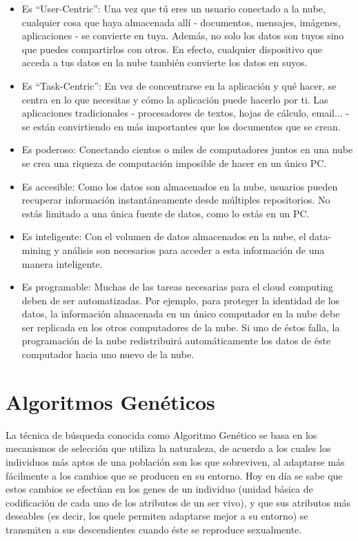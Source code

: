 \documentclass[runningheads]{llncs}
\begin{document}
\begin{itemize}

\item Es ``User-Centric'': Una vez que tú eres un usuario conectado a la nube, cualquier cosa que haya almacenada allí - documentos, mensajes, 
imágenes, aplicaciones - se convierte en tuya. Además, no solo los datos son tuyos sino que puedes compartirlos con otros. 
En efecto, cualquier dispositivo que acceda a tus datos en la nube también convierte los datos en suyos.
\item Es ``Task-Centric'': En vez de concentrarse en la aplicación y qué hacer, se centra en lo que necesitas y cómo la aplicación puede 
hacerlo por ti. Las aplicaciones tradicionales - procesadores de textos, hojas de cálculo, email... -  se están convirtiendo en más 
importantes que los documentos que se crean.
\item Es poderoso: Conectando cientos o miles de computadores juntos en una nube se crea una riqueza de computación imposible de hacer 
en un único PC.
\item Es accesible: Como los datos son almacenados en la nube, usuarios pueden recuperar información instantáneamente desde múltiples 
repositorios. No estás limitado a una única fuente de datos, como lo estás en un PC.
\item Es inteligente: Con el volumen de datos almacenados en la nube, el data-mining y análisis son necesarios para acceder a esta 
información de una manera inteligente.
\item Es programable: Muchas de las tareas necesarias para el cloud computing deben de ser automatizadas. Por ejemplo, para proteger 
la identidad de los datos, la información almacenada en un único computador en la nube debe ser replicada en los otros computadores 
de la nube. Si uno de éstos falla, la programación de la nube redistribuirá automáticamente los datos de éste computador hacia uno 
nuevo de la nube.

\end{itemize}

\section{Algoritmos Genéticos}


La técnica de búsqueda conocida como Algoritmo Genético se basa en los mecanismos de selección que utiliza la naturaleza, 
de acuerdo a los cuales los individuos más aptos de una población son los que sobreviven, al adaptarse más
fácilmente a los cambios que se producen en su entorno. Hoy en día se sabe que estos cambios se efectúan en los genes de 
un individuo (unidad básica de codificación de cada uno de los atributos de un ser vivo), 
y que sus atributos más deseables (es decir, los quele permiten adaptarse mejor a su entorno) se transmiten a sus descendientes 
cuando éste se reproduce sexualmente. 
\end{document}
